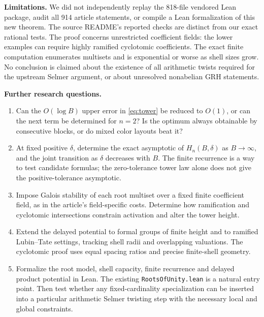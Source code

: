 \documentclass[11pt]{article}
\theoremstyle{remark}\newtheorem{remark}[theorem]{Remark}
\newcommand{\code}[1]{\texttt{#1}}
\begin{document}
\textbf{Limitations.} We did not independently replay the 818-file vendored Lean package, audit all 914 article statements, or compile a Lean formalization of this new theorem. The source README's reported checks are distinct from our exact rational tests. The proof concerns unrestricted coefficient fields: the lower examples can require highly ramified cyclotomic coefficients. The exact finite computation enumerates multisets and is exponential or worse as shell sizes grow. No conclusion is claimed about the existence of all arithmetic twists required for the upstream Selmer argument, or about unresolved nonabelian GRH statements.

\textbf{Further research questions.}
\begin{enumerate}
\item Can the $O(\log B)$ upper error in \eqref{eq:tower} be reduced to $O(1)$, or can the next term be determined for $n=2$? Is the optimum always obtainable by consecutive blocks, or do mixed color layouts beat it?
\item At fixed positive $\delta$, determine the exact asymptotic of $H_n(B,\delta)$ as $B\to\infty$, and the joint transition as $\delta$ decreases with $B$. The finite recurrence is a way to test candidate formulas; the zero-tolerance tower law alone does not give the positive-tolerance asymptotic.
\item Impose Galois stability of each root multiset over a fixed finite coefficient field, as in the article's field-specific costs. Determine how ramification and cyclotomic intersections constrain activation and alter the tower height.
\item Extend the delayed potential to formal groups of finite height and to ramified Lubin--Tate settings, tracking shell radii and overlapping valuations. The cyclotomic proof uses equal spacing ratios and precise finite-shell geometry.
\item Formalize the root model, shell capacity, finite recurrence and delayed product potential in Lean. The existing \code{RootsOfUnity.lean} is a natural entry point. Then test whether any fixed-cardinality specialization can be inserted into a particular arithmetic Selmer twisting step with the necessary local and global constraints.
\end{enumerate}
\end{document}
